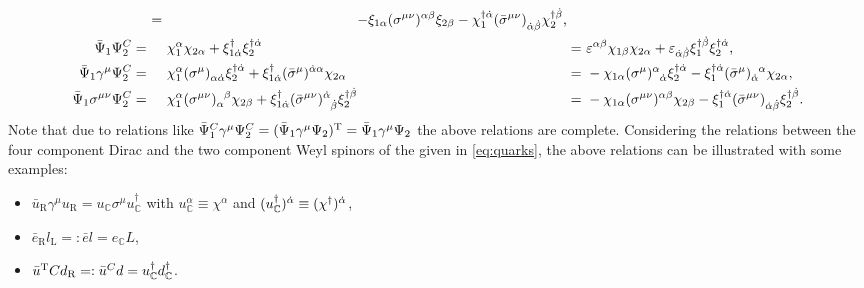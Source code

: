 \begin{equation}
{\begin{alignedat}{5}
		&&=\ && - \xi_{1 \alpha} \tensor{(\sigma^{\mu \nu})}{^{\alpha \beta}} \xi_{2 \beta} - \chi_{1}^{\dagger \dot{\alpha}} \tensor{(\bar{\sigma}^{\mu \nu})}{_{\dot{\alpha} \dot{\beta}}} \chi_{2}^{\dagger \dot{\beta}} \text{,}\\
%		
%
		\bar{\Psi}_{1} \Psi_{2}^{C} &=\ && \chi_{1}^{\alpha} \chi_{2 \alpha} + \xi_{1 \dot{\alpha}}^{\dagger} \xi_{2}^{\dagger \dot{\alpha}}
		&&=\ && \eps^{\alpha \beta} \chi_{1 \beta} \chi_{2 \alpha} + \eps_{\dot{\alpha} \dot{\beta}} \xi_{1}^{\dagger \dot{\beta}} \xi_{2}^{\dagger \dot{\alpha}} \text{,} \\
%		
		\bar{\Psi}_{1} \gamma^{\mu} \Psi_{2}^{C} &=\ && \chi_{1}^{\alpha} \tensor{(\sigma^{\mu})}{_{\alpha \dot{\alpha}}} \xi_{2}^{\dagger \dot{\alpha}} + \xi_{1 \dot{\alpha}}^{\dagger} \tensor{(\bar{\sigma}^{\mu})}{^{\dot{\alpha} \alpha}} \chi_{2 \alpha} &&=\ && - \chi_{1 \alpha} \tensor{(\sigma^{\mu})}{^{\alpha} _{\dot{\alpha}}} \xi_{2}^{\dagger \dot{\alpha}} - \xi_{1}^{\dagger \dot{\alpha}} \tensor{(\bar{\sigma}^{\mu})}{_{\dot{\alpha}} ^{\alpha}} \chi_{2 \alpha} \text{,} \\
%		
		\bar{\Psi}_{1} \sigma^{\mu \nu} \Psi_{2}^{C} &=\ && \chi_{1}^{\alpha} \tensor{(\sigma^{\mu \nu})}{_{\alpha}^{\beta}} \chi_{2 \beta} + \xi_{1 \dot{\alpha}}^{\dagger} \tensor{(\bar{\sigma}^{\mu \nu})}{^{\dot{\alpha}} _{\dot{\beta}}} \xi_{2}^{\dagger \dot{\beta}}
		&&=\ && - \chi_{1 \alpha} \tensor{(\sigma^{\mu \nu})}{^{\alpha \beta}} \chi_{2 \beta} - \xi_{1}^{\dagger \dot{\alpha}} \tensor{(\bar{\sigma}^{\mu \nu})}{_{\dot{\alpha} \dot{\beta}}} \xi_{2}^{\dagger \dot{\beta}} \text{.}
	\end{alignedat}
	}
	\label{eq:4SpinorRelations}
\end{equation}
Note that due to relations like $ \bar{\Psi}_{1}^{C} \gamma^{\mu}  \Psi^{C}_{2} = (\bar{\Psi}_{1} \gamma^{\mu} \Psi_{2})^{\mathrm{T}} = \bar{\Psi}_{1} \gamma^{\mu} \Psi_{2} $ the above relations are complete.
Considering the relations between the four component Dirac and the two component Weyl spinors of the \sm{} given in \cref{eq:quarks}, the above relations can be illustrated with some examples:
\begin{itemize}
	\item $ \bar{u}_{\mathrm{R}} \gamma^{\mu} u_{\mathrm{R}} = u_{\mathbb{C}} \sigma^{\mu} u_{\mathbb{C}}^{\dagger} $ with $ u_{\mathbb{C}}^{\alpha} \equiv \chi^{\alpha} $ and $ \tensor{(u_{\mathbb{C}}^{\dagger})}{^{\dot{\alpha}}} \equiv \tensor{(\chi^{\dagger})}{^{\dot{\alpha}}} $,
	\item $ \bar{e}_{\mathrm{R}} l_{\mathrm{L}} =: \bar{e} l = e_{\mathbb{C}} L $,
	\item $ \bar{u}^{\mathrm{T}} C d_{\mathrm{R}} =: \bar{u}^{C} d = u_{\mathbb{C}}^{\dagger} d_{\mathbb{C}}^{\dagger} $.
\end{itemize}

